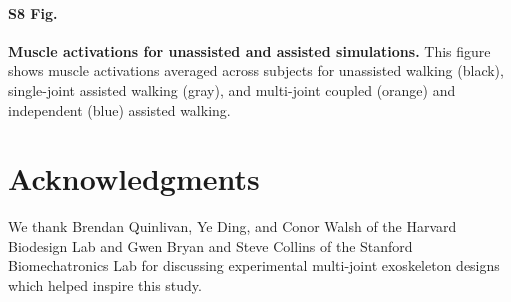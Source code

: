 \documentclass[10pt,letterpaper]{article}
\begin{document}
\paragraph*{S8 Fig.}
\label{S8_Fig}
{\bf Muscle activations for unassisted and assisted simulations.} This figure shows muscle activations averaged across subjects for unassisted walking (black), single-joint assisted walking (gray), and multi-joint coupled (orange) and independent (blue) assisted walking.

\section*{Acknowledgments}
We thank Brendan Quinlivan, Ye Ding, and Conor Walsh of the Harvard Biodesign Lab and Gwen Bryan and Steve Collins of the Stanford Biomechatronics Lab for discussing experimental multi-joint exoskeleton designs which helped inspire this study. 

\nolinenumbers


\end{document}
